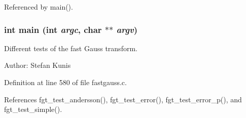 Referenced by main().\hypertarget{group__applications__fastgauss_g3c04138a5bfe5d72780bb7e82a18e627}{
\subsubsection{\setlength{\rightskip}{0pt plus 5cm}int main (int {\em argc}, char $\ast$$\ast$ {\em argv})}}
\label{group__applications__fastgauss_g3c04138a5bfe5d72780bb7e82a18e627}


Different tests of the fast Gauss transform. 

\begin{Desc}
\item[Author:]Stefan Kunis \end{Desc}


Definition at line 580 of file fastgauss.c.

References fgt\_\-test\_\-andersson(), fgt\_\-test\_\-error(), fgt\_\-test\_\-error\_\-p(), and fgt\_\-test\_\-simple().